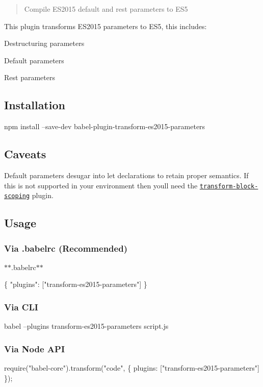 \begin{quote}
Compile E\+S2015 default and rest parameters to E\+S5 \end{quote}


This plugin transforms E\+S2015 parameters to E\+S5, this includes\+:


\begin{DoxyItemize}
\item Destructuring parameters
\item Default parameters
\item Rest parameters
\end{DoxyItemize}

\subsection*{Installation}


\begin{DoxyCode}
npm install --save-dev babel-plugin-transform-es2015-parameters
\end{DoxyCode}


\subsection*{Caveats}

Default parameters desugar into {\ttfamily let} declarations to retain proper semantics. If this is not supported in your environment then you\textquotesingle{}ll need the \href{http://babeljs.io/docs/plugins/transform-es2015-block-scoping}{\tt transform-\/block-\/scoping} plugin.

\subsection*{Usage}

\subsubsection*{Via {\ttfamily .babelrc} (Recommended)}

$\ast$$\ast$.babelrc$\ast$$\ast$


\begin{DoxyCode}
\{
  "plugins": ["transform-es2015-parameters"]
\}
\end{DoxyCode}


\subsubsection*{Via C\+LI}


\begin{DoxyCode}
babel --plugins transform-es2015-parameters script.js
\end{DoxyCode}


\subsubsection*{Via Node A\+PI}


\begin{DoxyCode}
require("babel-core").transform("code", \{
  plugins: ["transform-es2015-parameters"]
\});
\end{DoxyCode}
 